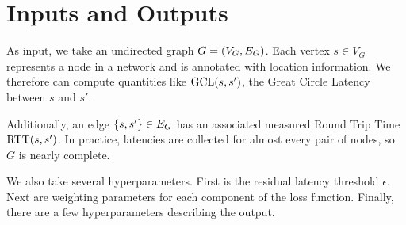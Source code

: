 



\section{Inputs and Outputs}
As input, we take an undirected graph \(G = \pof{V_G, E_G}\). Each vertex \(s \in V_G\) represents a node in a network and is annotated with location information. We therefore can compute quantities like \(\GCL\pof{s, s'}\), the Great Circle Latency between \(s\) and \(s'\).

Additionally, an edge \(\cof{s, s'} \in E_G\) has an associated measured Round Trip Time \(\RTT\pof{s, s'}\). In practice, latencies are collected for almost every pair of nodes, so \(G\) is nearly complete.

We also take several hyperparameters. First is the residual latency threshold \(\epsilon\). Next are weighting parameters for each component of the loss function. Finally, there are a few hyperparameters describing the output.

